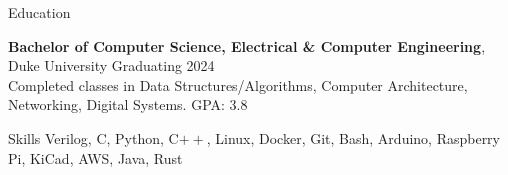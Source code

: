 \documentclass{resume}
\begin{document}






\begin{rSection}{Education}

\textbf{Bachelor of Computer Science, Electrical \& Computer Engineering}, Duke University \hfill {Graduating 2024}\\
Completed classes in Data Structures/Algorithms, Computer Architecture, Networking, Digital Systems. \hfill {GPA: 3.8}


\end{rSection}

\begin{rSection}{Skills}
    Verilog, C, Python, C$++$, Linux, Docker, Git, Bash, Arduino, Raspberry Pi, KiCad, AWS,  Java, Rust
\end{rSection}

\end{document}
